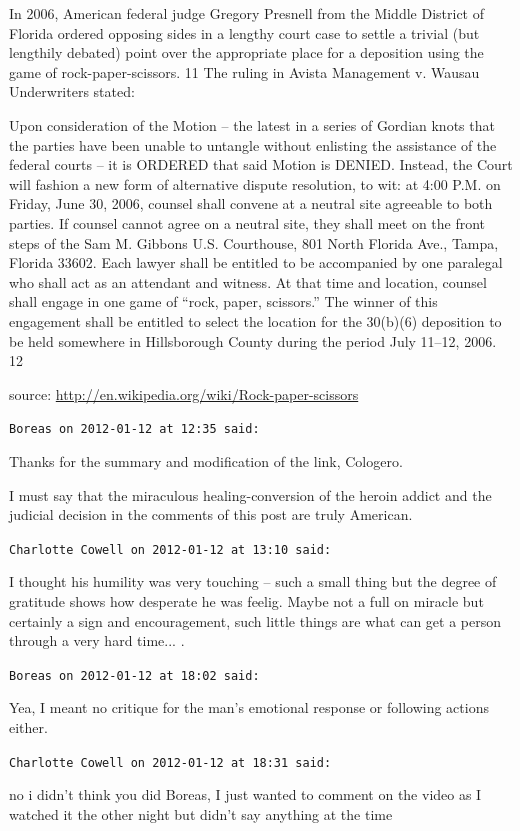 \begin{footnotesize}
\begin{sffamily}
In 2006, American federal judge Gregory Presnell from the Middle District of Florida ordered opposing sides in a lengthy court case to settle a trivial (but lengthily debated) point over the appropriate place for a deposition using the game of rock-paper-scissors. 11 The ruling in Avista Management v. Wausau Underwriters stated:

Upon consideration of the Motion -- the latest in a series of Gordian knots that the parties have been unable to untangle without enlisting the assistance of the federal courts -- it is ORDERED that said Motion is DENIED. Instead, the Court will fashion a new form of alternative dispute resolution, to wit: at 4:00 P.M. on Friday, June 30, 2006, counsel shall convene at a neutral site agreeable to both parties. If counsel cannot agree on a neutral site, they shall meet on the front steps of the Sam M. Gibbons U.S. Courthouse, 801 North Florida Ave., Tampa, Florida 33602. Each lawyer shall be entitled to be accompanied by one paralegal who shall act as an attendant and witness. At that time and location, counsel shall engage in one game of ``rock, paper, scissors.'' The winner of this engagement shall be entitled to select the location for the 30(b)(6) deposition to be held somewhere in Hillsborough County during the period July 11--12, 2006. 12 

source:
\url{http://en.wikipedia.org/wiki/Rock-paper-scissors}


\hfill

\texttt{Boreas on 2012-01-12 at 12:35 said:}

Thanks for the summary and modification of the link, Cologero.

I must say that the miraculous healing-conversion of the heroin addict and the judicial decision in the comments of this post are truly American.

\hfill

\texttt{Charlotte Cowell on 2012-01-12 at 13:10 said:}

I thought his humility was very touching -- such a small thing but the degree of gratitude shows how desperate he was feelig. Maybe not a full on miracle but certainly a sign and encouragement, such little things are what can get a person through a very hard time... .

\hfill

\texttt{Boreas on 2012-01-12 at 18:02 said:}

Yea, I meant no critique for the man's emotional response or following actions either.

\hfill

\texttt{Charlotte Cowell on 2012-01-12 at 18:31 said:}

no i didn't think you did Boreas, I just wanted to comment on the video as I watched it the other night but didn't say anything at the time


\hfill

\end{sffamily}
\end{footnotesize}

